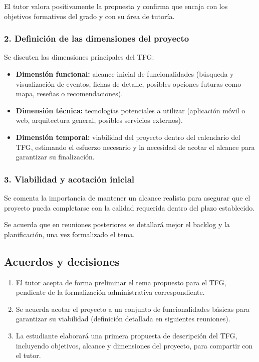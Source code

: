 El tutor valora positivamente la propuesta y confirma que encaja con los objetivos formativos del grado y con su área de tutoría.

\subsubsection*{2. Definición de las dimensiones del proyecto}
Se discuten las dimensiones principales del TFG:

\begin{itemize}
    \item \textbf{Dimensión funcional:} alcance inicial de funcionalidades (búsqueda y visualización de eventos, fichas de detalle, posibles opciones futuras como mapa, reseñas o recomendaciones).
    \item \textbf{Dimensión técnica:} tecnologías potenciales a utilizar (aplicación móvil o web, arquitectura general, posibles servicios externos).
    \item \textbf{Dimensión temporal:} viabilidad del proyecto dentro del calendario del TFG, estimando el esfuerzo necesario y la necesidad de acotar el alcance para garantizar su finalización.
\end{itemize}

\subsubsection*{3. Viabilidad y acotación inicial}
Se comenta la importancia de mantener un alcance realista para asegurar que el proyecto pueda completarse con la calidad requerida dentro del plazo establecido.

Se acuerda que en reuniones posteriores se detallará mejor el backlog y la planificación, una vez formalizado el tema.

\subsection*{Acuerdos y decisiones}
\begin{enumerate}
    \item El tutor acepta de forma preliminar el tema propuesto para el TFG, pendiente de la formalización administrativa correspondiente.
    \item Se acuerda acotar el proyecto a un conjunto de funcionalidades básicas para garantizar su viabilidad (definición detallada en siguientes reuniones).
    \item La estudiante elaborará una primera propuesta de descripción del TFG, incluyendo objetivos, alcance y dimensiones del proyecto, para compartir con el tutor.
\end{enumerate}

